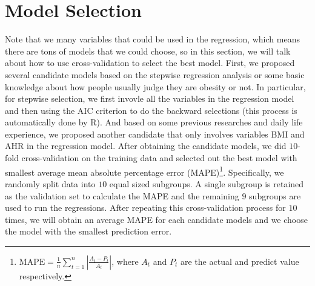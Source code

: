 \documentclass[letterpaper,10pt]{article}
\begin{document}
\section{Model Selection}
Note that we many variables that could be used in the regression, which means there are tons of models that we could choose, so in this section, we will talk about how to use cross-validation to select the best model. First, we proposed several candidate models based on the stepwise regression analysis or some basic knowledge about how people usually judge they are obesity or not. In particular, for stepwise selection, we first invovle all the variables in the regression model and then using the AIC criterion to do the backward selections (this process is automatically done by R). And based on some previous researches and daily life experience, we proposed another candidate that only involves variables BMI and AHR in the regression model. After obtaining the candidate models, we did $10$-fold cross-validation on the training data and selected out the best model with smallest average mean absolute percentage error (MAPE)\footnote{$\text{MAPE} = \frac{1}{n}\sum_{t=1}^{n}|\frac{A_t - P_t}{A_t}|$, where $A_t$ and $P_t$ are the actual and predict value respectively.}. Specifically, we randomly split data into $10$ equal sized subgroups. A single subgroup is retained as the validation set to calculate the MAPE and the remaining $9$ subgroups are used to run the regressions. After repeating this cross-validation process for $10$ times, we will obtain an average MAPE for each candidate models and we choose the model with the smallest prediction error.
\end{document}
